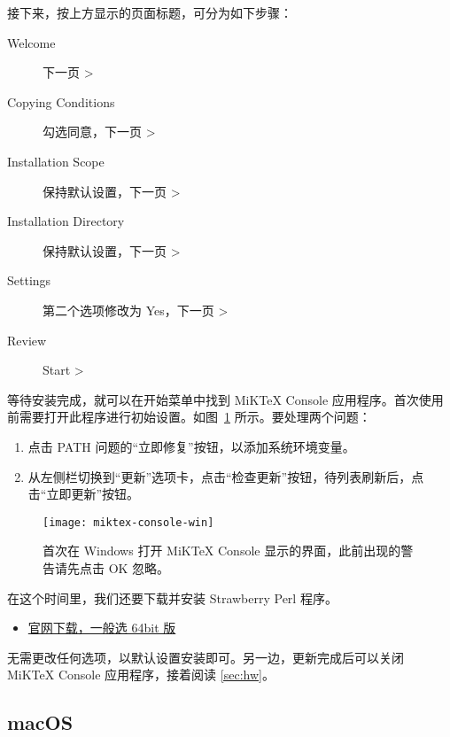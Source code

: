 接下来，按上方显示的页面标题，可分为如下步骤：

\begin{description}
  \item[Welcome] 下一页 >
  \item[Copying Conditions] 勾选同意，下一页 >
  \item[Installation Scope] 保持默认设置，下一页 >
  \item[Installation Directory] 保持默认设置，下一页 >
  \item[Settings] 第二个选项修改为 Yes，下一页 >
  \item[Review] Start >
\end{description}

等待安装完成，就可以在开始菜单中找到 MiKTeX Console 应用程序。首次使用前需要打开此程序进行初始设置。如图~\ref{fig:miktex-console-win} 所示。要处理两个问题：
\begin{enumerate}
  \item 点击 PATH 问题的“立即修复”按钮，以添加系统环境变量。
  \item 从左侧栏切换到“更新”选项卡，点击“检查更新”按钮，待列表刷新后，点击“立即更新”按钮。
\end{enumerate}

\begin{figure}[htbp]
  \caption{首次在 Windows 打开 MiKTeX Console 显示的界面，此前出现的警告请先点击 OK 忽略。}
  \label{fig:miktex-console-win}
  \texttt{[image: miktex-console-win]}
\end{figure}

在这个时间里，我们还要下载并安装 Strawberry Perl 程序。

\begin{itemize}
  \item \href{https://strawberryperl.com/}{\faExternalLink* 官网下载，一般选 64bit 版}
\end{itemize}

无需更改任何选项，以默认设置安装即可。另一边，更新完成后可以关闭 MiKTeX Console 应用程序，接着阅读 \ref{sec:hw}。

\subsection{macOS}
\label{subsec:mik-mac}

